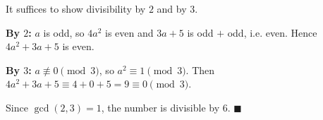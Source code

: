It suffices to show divisibility by $2$ and by $3$.

\textbf{By $2$:} $a$ is odd, so $4a^2$ is even and $3a+5$ is odd $+$ odd, i.e. even. Hence $4a^2+3a+5$ is even.

\textbf{By $3$:} $a\not\equiv0\pmod3$, so $a^2\equiv1\pmod 3$. Then $4a^2+3a+5\equiv4+0+5=9\equiv0\pmod3$.

Since $\gcd(2,3)=1$, the number is divisible by $6$. $\blacksquare$
